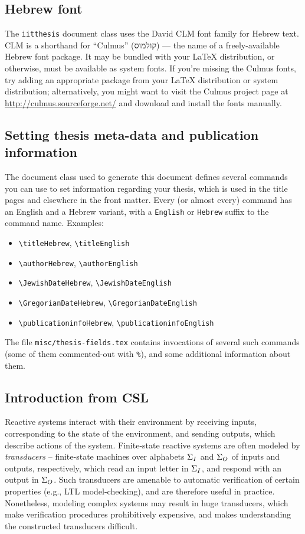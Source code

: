 \subsection*{Hebrew font}

The \texttt{iitthesis} document class uses the David CLM font family for Hebrew text. CLM is a shorthand for ``Culmus'' (\texthebrew{קולמוס}) --- the name of a freely-available Hebrew font package. It may be bundled with your LaTeX distribution, or otherwise, must be available as system fonts. If you're missing the Culmus fonts, try adding an appropriate package from your LaTeX distribution or system distribution; alternatively, you might want to visit the Culmus project page at \url{http://culmus.sourceforge.net/} and download and install the fonts manually.

\subsection*{Setting thesis meta-data and publication information}

The document class used to generate this document defines several commands you can use to set information  regarding your thesis, which is used in the title pages and elsewhere in the front matter.  Every (or almost every) command has an English and a Hebrew variant, with a \texttt{English} or \texttt{Hebrew} suffix to the command name. Examples:
\begin{itemize}
\item \verb|\titleHebrew|, \verb|\titleEnglish|
\item \verb|\authorHebrew|, \verb|\authorEnglish|
\item \verb|\JewishDateHebrew|, \verb|\JewishDateEnglish|
\item \verb|\GregorianDateHebrew|, \verb|\GregorianDateEnglish|
\item \verb|\publicationinfoHebrew|, \verb|\publicationinfoEnglish|
\end{itemize}

The file \texttt{misc/thesis-fields.tex} contains invocations of several such commands (some of them commented-out with \texttt{\%}), and some additional information about them.

\subsection*{Introduction from CSL}

Reactive systems interact with their environment by receiving inputs, corresponding to the state of the environment, and sending outputs, which describe actions of the system. Finite-state reactive systems are often modeled by \emph{transducers} -- finite-state machines over alphabets $\Sigma_{I}$ and $\Sigma_{O}$ of inputs and outputs, respectively, which read an input letter in $\Sigma_{I}$, and respond with an output in $\Sigma_{O}$. 
Such transducers are amenable to automatic verification of certain properties (e.g., LTL model-checking), and are therefore useful in practice. Nonetheless, modeling complex systems may result in huge transducers, which make verification procedures prohibitively expensive, and makes understanding the constructed transducers difficult.

